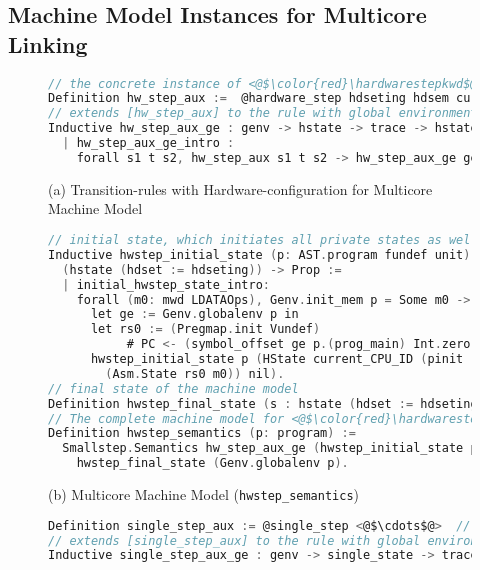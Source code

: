 
\subsection{Machine Model Instances for Multicore Linking}
\label{chapter:certikos:subsec:intermediate-machine-instantiation}



\begin{figure}
\begin{lstlisting}[language=C]
// the concrete instance of <@$\color{red}\hardwarestepkwd$@>
Definition hw_step_aux :=  @hardware_step hdseting hdsem current_CPU_ID.
// extends [hw_step_aux] to the rule with global environment  
Inductive hw_step_aux_ge : genv -> hstate -> trace -> hstate -> Prop :=
  | hw_step_aux_ge_intro : 
    forall s1 t s2, hw_step_aux s1 t s2 -> hw_step_aux_ge ge s1 t s2.
\end{lstlisting}
\begin{center}
(a) Transition-rules with Hardware-configuration for Multicore Machine Model
\end{center}
\begin{lstlisting}[language=C, deletekeywords={int}]    
// initial state, which initiates all private states as well as a global log
Inductive hwstep_initial_state (p: AST.program fundef unit): 
  (hstate (hdset := hdseting)) -> Prop := 
  | initial_hwstep_state_intro: 
    forall (m0: mwd LDATAOps), Genv.init_mem p = Some m0 ->
      let ge := Genv.globalenv p in
      let rs0 := (Pregmap.init Vundef) 
           # PC <- (symbol_offset ge p.(prog_main) Int.zero) # ESP <- Vzero in
      hwstep_initial_state p (HState current_CPU_ID (pinit (B := core_set)
        (Asm.State rs0 m0)) nil).
// final state of the machine model 
Definition hwstep_final_state (s : hstate (hdset := hdseting)) (i : int) := False.
// The complete machine model for <@$\color{red}\hardwarestepkwd$@> with proper initial and final states  
Definition hwstep_semantics (p: program) :=
  Smallstep.Semantics hw_step_aux_ge (hwstep_initial_state p) 
    hwstep_final_state (Genv.globalenv p).
\end{lstlisting}
\begin{center}
(b) Multicore Machine Model (\lstinline$hwstep_semantics$)
\end{center}
\begin{lstlisting}[language=C]
Definition single_step_aux := @single_step <@$\cdots$@>  // the concrete instance of <@$\color{red}\singlestepkwd$@>
// extends [single_step_aux] to the rule with global environment  
Inductive single_step_aux_ge : genv -> single_state -> trace -> 

\end{lstlisting}
\end{figure}
